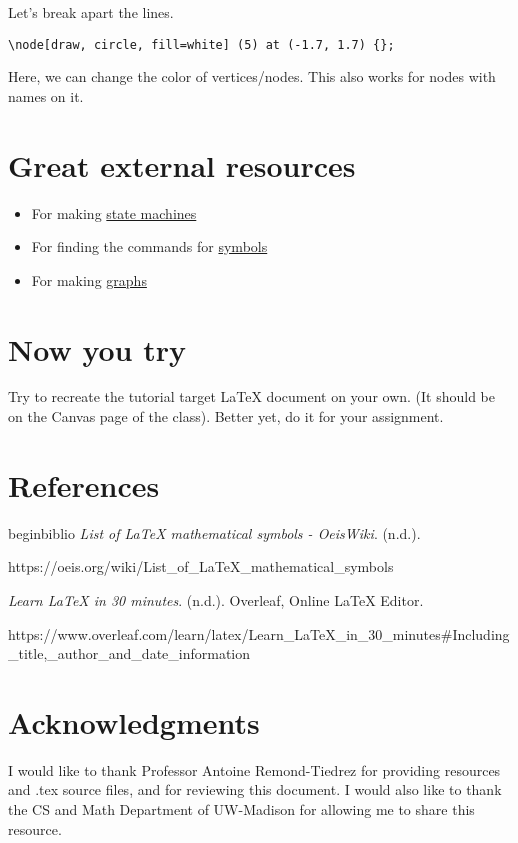 \documentclass[11pt]{article}
\begin{document}
Let's break apart the lines.
\vspace{3mm}

\verb|\node[draw, circle, fill=white] (5) at (-1.7, 1.7) {};|
\vspace{3mm}

Here, we can change the color of vertices/nodes. This also works for nodes with names on it.

\pagebreak{}

\section{Great external resources}
\begin{itemize}
    \item For making \textcolor{blue}{\href{https://madebyevan.com/fsm/}{state machines}}
    \item For finding the commands for \textcolor{blue}{\href{https://detexify.kirelabs.org/classify.html}{symbols}}
    \item For making \textcolor{blue}{\href{https://tikz.dev/tikz-graphs}{graphs}} 
\end{itemize}

\section{Now you try}
Try to recreate the tutorial target \LaTeX{} document on your own. (It should be on the Canvas page of the class). Better yet, do it for your assignment.

\section{References}
begin{biblio}
\emph{List of LaTeX mathematical symbols - OeisWiki}. (n.d.). 
\vspace{0mm}

https://oeis.org/wiki/List\_of\_LaTeX\_mathematical\_symbols
\vspace{3mm}

\emph{Learn LaTeX in 30 minutes}. (n.d.). Overleaf, Online LaTeX Editor. 
\vspace{0mm}

https://www.overleaf.com/learn/latex/Learn\_LaTeX\_in\_30\_minutes\#Including\_title,\_author\_and\_date\_information

\section{Acknowledgments}
I would like to thank Professor Antoine Remond-Tiedrez for providing resources and .tex source files, and for reviewing this document. I would also like to thank the CS and Math Department of UW-Madison for allowing me to share this resource.
\end{document}
